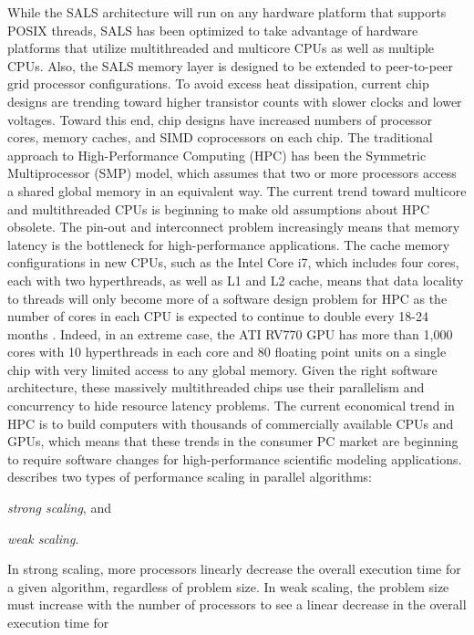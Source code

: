 While the SALS architecture will run on any hardware platform that
supports POSIX threads, SALS has been optimized to take advantage of
hardware platforms that utilize multithreaded and multicore CPUs as
well as multiple CPUs.  Also, the SALS memory layer is designed to be
extended to peer-to-peer grid processor configurations.  To avoid
excess heat dissipation, current chip designs are trending toward
higher transistor counts with slower clocks and lower voltages.
Toward this end, chip designs have increased numbers of processor
cores, memory caches, and SIMD coprocessors on each chip.  The
traditional approach to High-Performance Computing (HPC) has been the
Symmetric Multiprocessor (SMP) model, which assumes that two or more
processors access a shared global memory in an equivalent way.  The
current trend toward multicore and multithreaded CPUs is beginning to
make old assumptions about HPC obsolete.  The pin-out and interconnect
problem increasingly means that memory latency is the bottleneck for
high-performance applications.  The cache memory configurations in new
CPUs, such as the Intel Core i7, which includes four cores, each with
two hyperthreads, as well as L1 and L2 cache, means that data locality
to threads will only become more of a software design problem for HPC
as the number of cores in each CPU is expected to continue to double
every 18-24 months \cite[]{sodan:2010,dongarra:2007}.  Indeed, in an
extreme case, the ATI RV770 GPU has more than 1,000 cores with 10
hyperthreads in each core and 80 floating point units on a single chip
with very limited access to any global memory.  Given the right
software architecture, these massively multithreaded chips use their
parallelism and concurrency to hide resource latency problems.  The
current economical trend in HPC is to build computers with thousands
of commercially available CPUs and GPUs, which means that these trends
in the consumer PC market are beginning to require software changes
for high-performance scientific modeling applications.
\cite{sodan:2010} describes two types of performance scaling in
parallel algorithms:
\begin{packed_enumerate}
\item{{\emph{strong scaling}}, and}
\item{{\emph{weak scaling}}.}
\end{packed_enumerate}
In strong scaling, more processors linearly decrease the overall
execution time for a given algorithm, regardless of problem size.  In
weak scaling, the problem size must increase with the number of
processors to see a linear decrease in the overall execution time for
